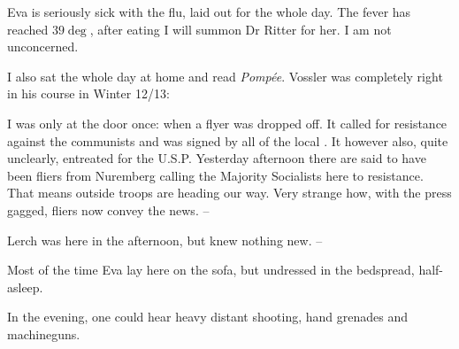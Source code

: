 
Eva is seriously sick with the flu, laid out for the whole day. The fever has reached $39\deg$, after eating I will summon Dr Ritter for her. I am not unconcerned.

I also sat the whole day at home and read \textit{Pompée}. Vossler was completely right in his course in Winter 12/13: 

I was only at the door once: when a flyer was dropped off. It called for resistance against the communists and was signed by all of the local . It however also, quite unclearly, entreated for the U.S.P. Yesterday afternoon there are said to have been fliers from Nuremberg calling the Majority Socialists here to resistance. That means outside troops are heading our way. Very strange how, with the press gagged, fliers now convey the news. --

Lerch was here in the afternoon, but knew nothing new. --

Most of the time Eva lay here on the sofa, but undressed in the bedspread, half-asleep. 

In the evening, one could hear heavy distant shooting, hand grenades and machineguns.